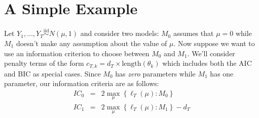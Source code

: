 \documentclass[12pt]{article}
\theoremstyle{definition}
\begin{document}



\section{A Simple Example}
Let $Y_1, \hdots, Y_T \overset{\mbox{iid}}{\sim} N(\mu,1)$ and consider two models: $M_0$ assumes that $\mu = 0$ while $M_1$ doesn't make any assumption about the value of $\mu$. Now suppose we want to use an information criterion to choose between $M_0$ and $M_1$. We'll consider penalty terms of the form $c_{T,k} = d_T 
\times \mbox{length}(\theta_k)$ which includes both the AIC and BIC as special cases. Since $M_0$ has \emph{zero} parameters while $M_1$ has one parameter, our information criteria are as follows:
	\begin{eqnarray*}
		IC_0 &=& 2 \max_\mu \left\{\ell_T(\mu)\colon M_0 \right\} \\
		IC_1 &=& 2 \max_\mu \left\{\ell_T(\mu)\colon M_1 \right\} - d_T
	\end{eqnarray*}
\end{document}
